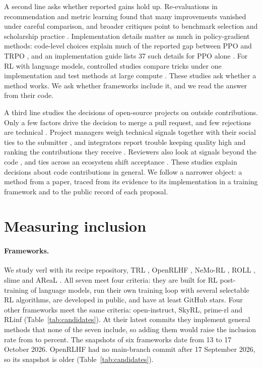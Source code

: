 \documentclass{article}
\begin{document}
A second line asks whether reported gains hold up. Re-evaluations in recommendation \citep{arxiv190706902} and metric learning \citep{arxiv200308505} found that many improvements vanished under careful comparison, and broader critiques point to benchmark selection \citep{arxiv210707002} and scholarship practice \citep{arxiv180703341}. Implementation details matter as much in policy-gradient methods: code-level choices explain much of the reported gap between PPO and TRPO \citep{arxiv200512729}, and an implementation guide lists 37 such details for PPO alone \citep{huang2022details}. For RL with language models, controlled studies compare tricks under one implementation \citep{arxiv250808221} and test methods at large compute \citep{arxiv251013786}. These studies ask whether a method works. We ask whether frameworks include it, and we read the answer from their code.

A third line studies the decisions of open-source projects on outside contributions. Only a few factors drive the decision to merge a pull request, and few rejections are technical \citep{gousios2014pull}. Project managers weigh technical signals together with their social ties to the submitter \citep{tsay2014influence}, and integrators report trouble keeping quality high and ranking the contributions they receive \citep{gousios2015integrator}. Reviewers also look at signals beyond the code \citep{ford2019beyond}, and ties across an ecosystem shift acceptance \citep{meijer2025ecosystem}. These studies explain decisions about code contributions in general. We follow a narrower object: a method from a paper, traced from its evidence to its implementation in a training framework and to the public record of each proposal.

\section{Measuring inclusion}
\label{sec:inclusion}

\paragraph{Frameworks.} We study verl \citep{arxiv240919256} with its recipe repository, TRL \citep{vonwerra2020trl}, OpenRLHF \citep{arxiv240511143}, NeMo-RL \citep{nemorl2025}, ROLL \citep{arxiv250606122}, slime \citep{slime2025} and AReaL \citep{arxiv250524298}. All seven meet four criteria: they are built for RL post-training of language models, run their own training loop with several selectable RL algorithms, are developed in public, and have at least \MinStars{} GitHub stars. Four other frameworks meet the same criteria: open-instruct, SkyRL, prime-rl and RLinf (Table~\ref{tab:candidates}). At their latest commits they implement \NFwExtraNew{} general methods that none of the seven include, so adding them would raise the inclusion rate from \RateMain{} to \RateWithExtra{} percent. The snapshots of six frameworks date from 13 to 17 October 2026. OpenRLHF had no main-branch commit after 17 September 2026, so its snapshot is older (Table~\ref{tab:candidates}).
\end{document}
